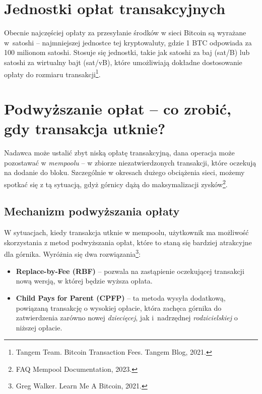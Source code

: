\documentclass[12pt,a4paper]{report}
\theoremstyle{definition} %
\begin{document}
	\section{Jednostki opłat transakcyjnych}
	\hspace*{\parindent}Obecnie najczęściej opłaty za przesyłanie środków w sieci Bitcoin są wyrażane w~satoshi – najmniejszej jednostce tej kryptowaluty, gdzie 1 BTC odpowiada za 100 milionom satoshi. Stosuje się jednostki, takie jak satoshi za baj (sat/B) lub satoshi za wirtualny bajt (sat/vB), które umożliwiają dokładne dostosowanie opłaty do rozmiaru 			transakcji\footnote{Tangem Team. Bitcoin Transaction Fees. Tangem Blog, 2021.}. 
	\section{Podwyższanie opłat – co zrobić, gdy transakcja utknie?}
	\hspace*{\parindent}\enlargethispage{2\baselineskip}Nadawca może ustalić zbyt niską opłatę transakcyjną, dana operacja może pozostawać w \textit{mempoolu} – w zbiorze niezatwierdzonych transakcji, które oczekują na dodanie do bloku. Szczególnie w okresach dużego obciążenia sieci, możemy spotkać się z tą sytuacją, gdyż górnicy dążą do maksymalizacji zysków\footnote{FAQ Mempool Documentation, 2023.}.
	\subsection{Mechanizm podwyższania opłaty}
	\hspace*{\parindent}W sytuacjach, kiedy transakcja utknie w mempoolu, użytkownik ma możliwość skorzystania z metod podwyższania opłat, które to staną się bardziej atrakcyjne dla górnika. Wyróżnia się dwa rozwiązania\footnote{Greg Walker. Learn Me A Bitcoin, 2021.}:
\begin{itemize}
	\item \textbf{Replace-by-Fee (RBF)} – pozwala na zastąpienie oczekującej transakcji nową wersją, w której będzie wyższa opłata.
	\item \textbf{Child Pays for Parent (CPFP)} – ta metoda wysyła dodatkową, powiązaną transakcję o wysokiej opłacie, która zachęca górnika do zatwierdzenia zarówno nowej \textit{dziecięcej}, jak i~nadrzędnej \textit{rodzicielskiej} o niższej opłacie. 
\end{itemize}
\end{document}
